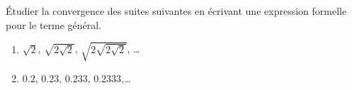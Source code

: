 

\begin{exercice}\label{exoINGE11140037}

	Étudier la convergence des suites suivantes en écrivant une expression formelle pour le terme général.
	\begin{enumerate}

		\item
			$\sqrt{2}$, $\sqrt{2\sqrt{2}}$, $\sqrt{2\sqrt{2\sqrt{2}}}$, \ldots
		\item
			$0.2$, $0.23$, $0.233$, $0.2333$,\ldots

	\end{enumerate}

\end{exercice}
